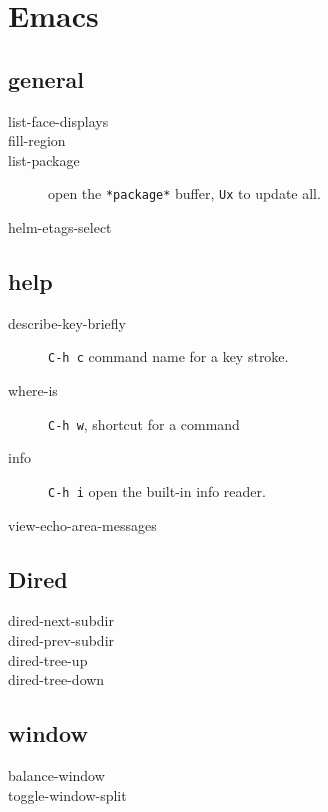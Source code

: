 \section{Emacs}

\subsection{general}
\begin{description}
\item [list-face-displays]
\item [fill-region]
\item [list-package] open the \texttt{*package*} buffer, \texttt{Ux}
  to update all.
\item [helm-etags-select]
\end{description}

\subsection{help}
\begin{description}
\item [describe-key-briefly] \texttt{C-h c} command name for a key
  stroke.
\item [where-is] \texttt{C-h w}, shortcut for a command
\item [info] \texttt{C-h i} open the built-in info reader.
\item [view-echo-area-messages]
\end{description}

\subsection{Dired}
\begin{description}
\item [dired-next-subdir]
\item [dired-prev-subdir]
\item [dired-tree-up]
\item [dired-tree-down]
\end{description}

\subsection{window}
\begin{description}
\item [balance-window]
\item [toggle-window-split]
\end{description}

